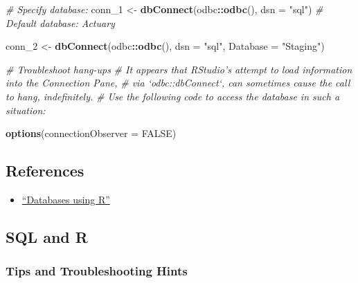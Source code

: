 \documentclass[
]{book}
\newenvironment{Shaded}{\begin{snugshade}}{\end{snugshade}}
\newcommand{\CommentTok}[1]{\textcolor[rgb]{0.56,0.35,0.01}{\textit{#1}}}
\newcommand{\DataTypeTok}[1]{\textcolor[rgb]{0.13,0.29,0.53}{#1}}
\newcommand{\DecValTok}[1]{\textcolor[rgb]{0.00,0.00,0.81}{#1}}
\newcommand{\KeywordTok}[1]{\textcolor[rgb]{0.13,0.29,0.53}{\textbf{#1}}}
\newcommand{\NormalTok}[1]{#1}
\newcommand{\OperatorTok}[1]{\textcolor[rgb]{0.81,0.36,0.00}{\textbf{#1}}}
\newcommand{\OtherTok}[1]{\textcolor[rgb]{0.56,0.35,0.01}{#1}}
\newcommand{\StringTok}[1]{\textcolor[rgb]{0.31,0.60,0.02}{#1}}
\providecommand{\tightlist}{%
  \setlength{\itemsep}{0pt}\setlength{\parskip}{0pt}}
\begin{document}
\begin{Shaded}
\begin{Highlighting}[]
\CommentTok{# Specify database:}
\NormalTok{conn_}\DecValTok{1}\NormalTok{ <-}\StringTok{ }\KeywordTok{dbConnect}\NormalTok{(odbc}\OperatorTok{::}\KeywordTok{odbc}\NormalTok{(), }\DataTypeTok{dsn =} \StringTok{"sql"}\NormalTok{) }\CommentTok{# Default database: Actuary}

\NormalTok{conn_}\DecValTok{2}\NormalTok{ <-}\StringTok{ }\KeywordTok{dbConnect}\NormalTok{(odbc}\OperatorTok{::}\KeywordTok{odbc}\NormalTok{(), }\DataTypeTok{dsn =} \StringTok{"sql"}\NormalTok{, }\DataTypeTok{Database =} \StringTok{"Staging"}\NormalTok{)}

\CommentTok{# Troubleshoot hang-ups}
\CommentTok{# It appears that RStudio's attempt to load information into the Connection Pane,}
\CommentTok{# via `odbc::dbConnect`, can sometimes cause the call to hang, indefinitely.}
\CommentTok{# Use the following code to access the database in such a situation:}

\KeywordTok{options}\NormalTok{(}\DataTypeTok{connectionObserver =} \OtherTok{FALSE}\NormalTok{)}
\end{Highlighting}
\end{Shaded}

\hypertarget{references}{%
\subsection{References}\label{references}}

\begin{itemize}
\tightlist
\item
  \href{db.rstudio.com}{``Databases using R''}
\end{itemize}

\hypertarget{sql-and-r}{%
\subsection{SQL and R}\label{sql-and-r}}

\hypertarget{tips-and-troubleshooting-hints}{%
\subsubsection{Tips and Troubleshooting Hints}\label{tips-and-troubleshooting-hints}}
\end{document}
